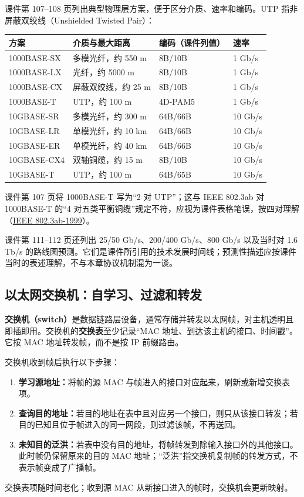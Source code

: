 课件第 107--108 页列出典型物理层方案，便于区分介质、速率和编码。UTP 指非屏蔽双绞线（Unshielded Twisted Pair）：
\begin{center}
\begin{tabularx}{0.98\textwidth}{l X l l}
\toprule
方案 & 介质与最大距离 & 编码（课件列值） & 速率\\
\midrule
1000BASE-SX & 多模光纤，约 550 m & 8B/10B & 1 Gb/s\\
1000BASE-LX & 光纤，约 5000 m & 8B/10B & 1 Gb/s\\
1000BASE-CX & 屏蔽双绞线，约 25 m & 8B/10B & 1 Gb/s\\
1000BASE-T & UTP，约 100 m & 4D-PAM5 & 1 Gb/s\\
10GBASE-SR & 多模光纤，约 300 m & 64B/66B & 10 Gb/s\\
10GBASE-LR & 单模光纤，约 10 km & 64B/66B & 10 Gb/s\\
10GBASE-ER & 单模光纤，约 40 km & 64B/66B & 10 Gb/s\\
10GBASE-CX4 & 双轴铜缆，约 15 m & 8B/10B & 10 Gb/s\\
10GBASE-T & UTP，约 100 m & 64B/65B & 10 Gb/s\\
\bottomrule
\end{tabularx}
\end{center}
课件第 107 页将 1000BASE-T 写为“2 对 UTP”；这与 IEEE 802.3ab 对 1000BASE-T 的“4 对五类平衡铜缆”规定不符，应视为课件表格笔误，按四对理解（\href{https://standards.ieee.org/ieee/802.3ab/1086/}{IEEE 802.3ab-1999}）。

课件第 111--112 页还列出 25/50 Gb/s、200/400 Gb/s、800 Gb/s 以及当时对 1.6 Tb/s 的路线图预测。它们是课件所引用的技术发展时间线；预测性描述应按课件当时的表述理解，不与本章协议机制混为一谈。


\subsection{以太网交换机：自学习、过滤和转发}
\textbf{交换机（switch）}是数据链路层设备，通常存储并转发以太网帧，对主机透明且即插即用。交换机的\textbf{交换表}至少记录“MAC 地址、到达该主机的接口、时间戳”。它按 MAC 地址转发帧，而不是按 IP 前缀路由。

交换机收到帧后执行以下步骤：
\begin{enumerate}
 \item \textbf{学习源地址：}将帧的源 MAC 与帧进入的接口对应起来，刷新或新增交换表项。
 \item \textbf{查询目的地址：}若目的地址在表中且对应另一个接口，则只从该接口转发；若目的已知且位于帧进入的同一网段，则过滤该帧，不再送回。
 \item \textbf{未知目的泛洪：}若表中没有目的地址，将帧转发到除输入接口外的其他接口。此时帧仍保留原来的目的 MAC 地址；“泛洪”指交换机复制帧的转发方式，不表示帧变成了广播帧。
\end{enumerate}
交换表项随时间老化；收到源 MAC 从新接口进入的帧时，交换机会更新映射。

